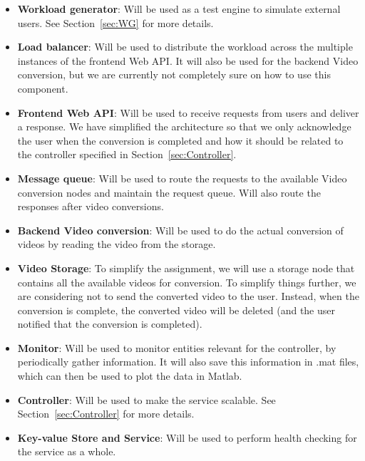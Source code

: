 \documentclass[a4paper, 10pt, english]{article}
\begin{document}
\begin{itemize}
	\item \textbf{Workload generator}: Will be used as a test engine to simulate external users. See Section~\ref{sec:WG} for more details.
	\item \textbf{Load balancer}: Will be used to distribute the workload across the multiple instances of the frontend Web API. It will also be used for the backend Video conversion, but we are currently not completely sure on how to use this component.
	\item \textbf{Frontend Web API}: Will be used to receive requests from users and deliver a response. We have simplified the architecture so that we only acknowledge the user when the conversion is completed and how it should be related to the controller specified in Section~\ref{sec:Controller}.
	\item \textbf{Message queue}: Will be used to route the requests to the available Video conversion nodes and maintain the request queue. Will also route the responses after video conversions.
	\item \textbf{Backend Video conversion}: Will be used to do the actual conversion of videos by reading the video from the storage.
	\item \textbf{Video Storage}: To simplify the assignment, we will use a storage node that contains all the available videos for conversion. To simplify things further, we are considering not to send the converted video to the user. Instead, when the conversion is complete, the converted video will be deleted (and the user notified that the conversion is completed).
	\item \textbf{Monitor}: Will be used to monitor entities relevant for the controller, by periodically gather information. It will also save this information in .mat files, which can then be used to plot the data in Matlab.
	\item \textbf{Controller}: Will be used to make the service scalable. See Section~\ref{sec:Controller} for more details.
	\item \textbf{Key-value Store and Service}: Will be used to perform health checking for the service as a whole.
\end{itemize}
\end{document}
